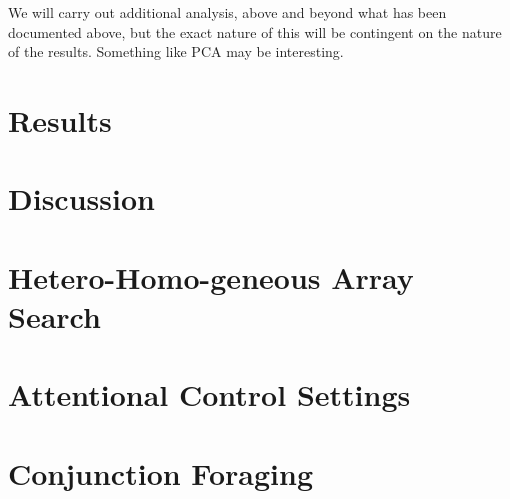 \documentclass[a4paper, oneside, 11pt, onecolumn]{article}
\begin{document}
We will carry out additional analysis, above and beyond what has been documented above, but the exact nature of this will be contingent on the nature of the results. Something like PCA may be interesting. 

\section{Results}

\section{Discussion}


\begin{appendices}
\section{Hetero-Homo-geneous Array Search}

\section{Attentional Control Settings}

\section{Conjunction Foraging}
\end{appendices}



\end{document}
